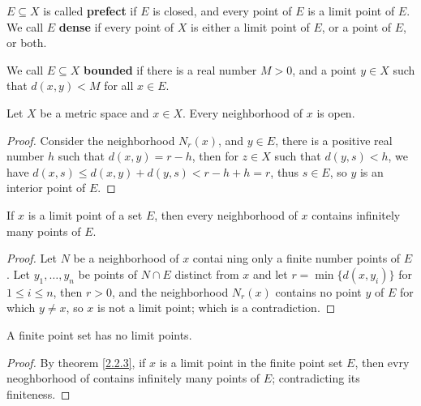 \begin{definition}
    $E \subseteq X$ is called \textbf{prefect} if  $E$ is closed, and every point of $E$ is a limit 
    point of $E$. We call $E$ \textbf{dense} if  every point of  $X$ is either a limit point 
    of $E$, or a point of  $E$, or both.
\end{definition}

\begin{definition}
    We call  $E \subseteq X$ \textbf{bounded} if there is a real number  $M>0$, and a point 
    $y \in X$ such that $d(x,y)<M$ for all $x \in E$.
\end{definition}

\begin{theorem}\label{2.2.2}
    Let $X$ be a metric space and  $x \in X$. Every neighborhood of  $x$ is open.
\end{theorem}
\begin{proof}
    Consider the neighborhood $N_r(x)$, and  $y \in E$, there is a positive real number  
    $h$ such that $d(x,y)=r-h$, then for $z \in X$ such that $d(y,s)<h$, we have 
    $d(x,s) \leq d(x,y)+d(y,s)<r-h+h=r$, thus $s \in E$, so $y$ is an interior point of $E$.
\end{proof}

\begin{theorem}\label{2.2.3}
    If $x$ is a limit point of a set  $E$, then every neighborhood of  $x$ contains infinitely many 
    points of  $E$.
\end{theorem}
\begin{proof}
    Let $N$ be a neighborhood of  $x$ contai ning only a finite number points of $E$. Let 
    $y_1, \dots, y_n$ be points of $N \cap E$ distinct from  $x$ and let $r=\min\{d(x,y_i)\}$ 
    for  $1 \leq i \leq n$, then  $r>0$, and the neighborhood  $N_r(x)$ contains no point  $y$ 
    of  $E$ for which $y \neq x$, so $x$ is not a limit point; which is a contradiction.
\end{proof}

\begin{corollary}
    A finite point set has no limit points.
\end{corollary}
\begin{proof}
    By theorem \ref{2.2.3}, if $x$ is a limit point in the finite point set $E$, then 
    evry neoghborhood of contains infinitely many points of $E$; contradicting its finiteness.
\end{proof}

